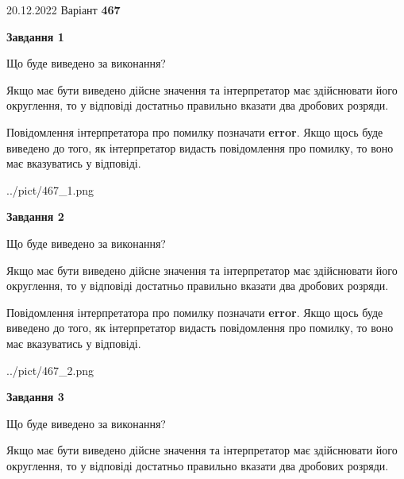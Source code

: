\documentclass[12pt, ukrainian]{article}
\begin{document}
{20.12.2022 Варіант \No \textbf { 467 }\par}
{
\begin {Large}

{\begin {center}\textbf{Завдання 1}\end {center}}\par
Що буде виведено за виконання? \par

Якщо має бути виведено дійсне значення та інтерпретатор має здійснювати його округлення, 
то у відповіді достатньо правильно вказати два дробових розряди.

Повідомлення інтерпретатора про помилку позначати \textbf{error}.
Якщо щось буде виведено до того, як інтерпретатор видасть повідомлення про помилку, 
то воно має вказуватись у відповіді. \par

\begin{center}
	{../pict/467_1.png}
\end{center}
\newpage

{\begin {center}\textbf{Завдання 2}\end {center}}\par
Що буде виведено за виконання? \par

Якщо має бути виведено дійсне значення та інтерпретатор має здійснювати його округлення, 
то у відповіді достатньо правильно вказати два дробових розряди.

Повідомлення інтерпретатора про помилку позначати \textbf{error}.
Якщо щось буде виведено до того, як інтерпретатор видасть повідомлення про помилку, 
то воно має вказуватись у відповіді. \par

\begin{center}
	{../pict/467_2.png}
\end{center}
\newpage

{\begin {center}\textbf{Завдання 3}\end {center}}\par
Що буде виведено за виконання? \par

Якщо має бути виведено дійсне значення та інтерпретатор має здійснювати його округлення, 
то у відповіді достатньо правильно вказати два дробових розряди.


\end{Large}}
\end{document}
